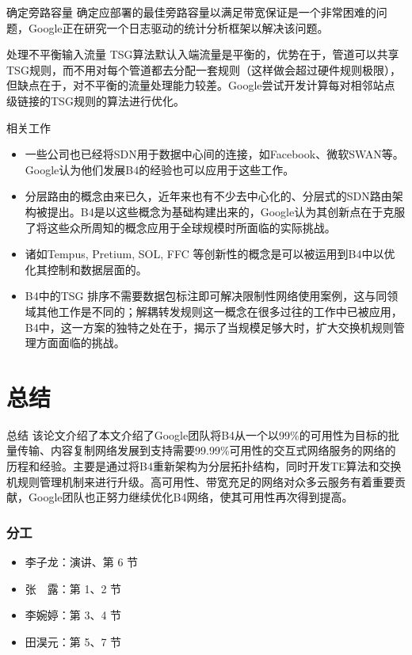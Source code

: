 \begin{frame}{确定旁路容量}
确定应部署的最佳旁路容量以满足带宽保证是一个非常困难的问题，Google正在研究一个日志驱动的统计分析框架以解决该问题。
\end{frame}

\begin{frame}{处理不平衡输入流量}
    TSG算法默认入端流量是平衡的，优势在于，管道可以共享TSG规则，而不用对每个管道都去分配一套规则（这样做会超过硬件规则极限），但缺点在于，对不平衡的流量处理能力较差。Google尝试开发计算每对相邻站点级链接的TSG规则的算法进行优化。
\end{frame}

\begin{frame}{相关工作}
    \begin{itemize}[<+->]
    \item {}  一些公司也已经将SDN用于数据中心间的连接，如Facebook、微软SWAN等。Google认为他们发展B4的经验也可以应用于这些工作。
    
    \item {} 分层路由的概念由来已久，近年来也有不少去中心化的、分层式的SDN路由架构被提出。B4是以这些概念为基础构建出来的，Google认为其创新点在于克服了将这些众所周知的概念应用于全球规模时所面临的实际挑战。
    
    \item {} 诸如Tempus, Pretium, SOL, FFC 等创新性的概念是可以被运用到B4中以优化其控制和数据层面的。
    
    \item {} B4中的TSG 排序不需要数据包标注即可解决限制性网络使用案例，这与同领域其他工作是不同的；解耦转发规则这一概念在很多过往的工作中已被应用，B4中，这一方案的独特之处在于，揭示了当规模足够大时，扩大交换机规则管理方面面临的挑战。
    \end{itemize}
    
\end{frame}

\section{总结}
\begin{frame}{总结}
    该论文介绍了本文介绍了Google团队将B4从一个以\alert{99\%}的可用性为目标的批量传输、内容复制网络发展到支持需要\alert{99.99\%}可用性的交互式网络服务的网络的历程和经验。主要是通过将B4重新架构为分层拓扑结构，同时开发TE算法和交换机规则管理机制来进行升级。高可用性、带宽充足的网络对众多云服务有着重要贡献，Google团队也正努力继续优化B4网络，使其可用性再次得到提高。
\end{frame}

\begin{frame}[plain]
\frametitle{分工}
\begin{itemize}
    \item 李子龙：演讲、第 6 节
    \item 张　露：第 1、2 节
    \item 李婉婷：第 3、4 节
    \item 田淏元：第 5、7 节
\end{itemize}
\end{frame}

    \makebottom
